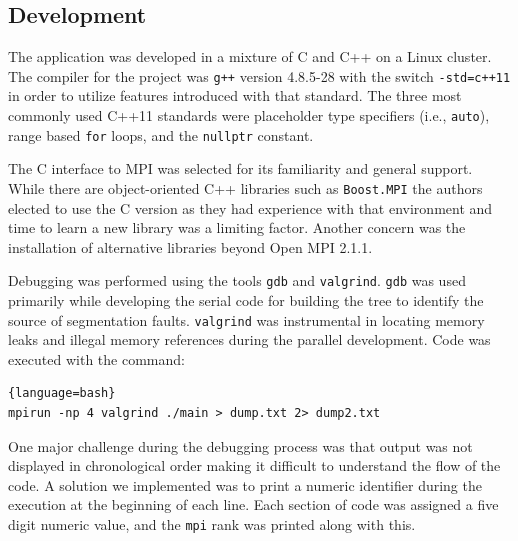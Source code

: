\documentclass{article}
\begin{document}
%
%

\subsection{Development}

The application was developed in a mixture of C and C++ on a Linux cluster. The compiler for the project was \texttt{g++} version 4.8.5-28 with the switch \texttt{-std=c++11} in order to utilize features introduced with that standard. The three most commonly used C++11 standards were placeholder type specifiers (i.e., \texttt{auto}), range based \texttt{for} loops, and the \texttt{nullptr} constant.

The C interface to MPI was selected for its familiarity and general support. While there are object-oriented C++ libraries such as \texttt{Boost.MPI} the authors elected to use the C version as they had experience with that environment and time to learn a new library was a limiting factor. Another concern was the installation of alternative libraries beyond Open MPI 2.1.1.

Debugging was performed using the tools \texttt{gdb} and \texttt{valgrind}. \texttt{gdb} was used primarily while developing the serial code for building the tree to identify the source of segmentation faults. \texttt{valgrind} was instrumental in locating memory leaks and illegal memory references during the parallel development. Code was executed with the command:

\begin{lstlisting}{language=bash}
mpirun -np 4 valgrind ./main > dump.txt 2> dump2.txt
\end{lstlisting}


One major challenge during the debugging process was that output was not displayed in chronological order making it difficult to understand the flow of the code. A solution we implemented was to print a numeric identifier during the execution at the beginning of each line. Each section of code was assigned a five digit numeric value, and the \texttt{mpi} rank was printed along with this. 
\end{document}
